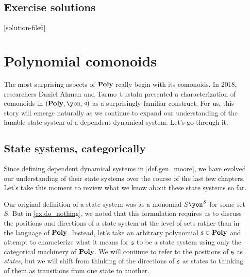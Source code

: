\documentclass[Book-Poly]{subfiles}
\begin{document}
\section{Exercise solutions}
{\footnotesize
}

[solution-file6]

\chapter{Polynomial comonoids}\label{ch.comon.sharp}


The most surprising aspects of $\mathbf{Poly}$ really begin with its comonoids.
In 2018, researchers Daniel Ahman and Tarmo Uustalu presented a characterization of comonoids in $(\poly,\yon,\tri)$ as a surprisingly familiar construct.
For us, this story will emerge naturally as we continue to expand our understanding of the humble state system of a dependent dynamical system.
Let's go through it.

\section{State systems, categorically}\label{sec.comon.sharp.state}

Since defining dependent dynamical systems in \cref{def.gen_moore}, we have evolved our understanding of their state systems over the course of the last few chapters. %
Let's take this moment to review what we know about these state systems so far. %

Our original definition of a state system was as a monomial $S\yon^S$ for some set $S$.
But in \cref{ex.do_nothing}, we noted that this formulation requires us to discuss the positions and directions of a state system at the level of sets rather than in the language of $\mathbf{Poly}$.
Instead, let's take an arbitrary polynomial $\mathfrak{s}\in\mathbf{Poly}$ and attempt to characterize what it means for $\mathfrak{s}$ to be a state system using only the categorical machinery of $\mathbf{Poly}$.
We will continue to refer to the positions of $\mathfrak{s}$ as \emph{states}, but we will shift from thinking of the directions of $\mathfrak{s}$ as states to thinking of them as transitions from one state to another.
\end{document}
